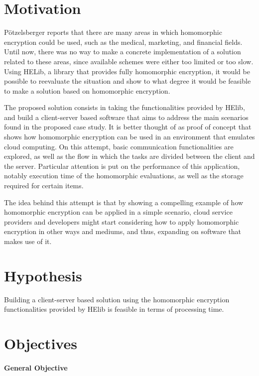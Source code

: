 \section{Motivation}

P{\"o}tzelsberger \cite{potzelsberger2013kv} reports that there are many areas in which homomorphic encryption could be used, such as the medical, marketing, and financial fields. Until now, there was no way to make a concrete implementation of a solution related to these areas, since available schemes were either too limited or too slow. Using HELib, a library that provides fully homomorphic encryption, it would be possible to reevaluate the situation and show to what degree it would be feasible to make a solution based on homomorphic encryption.

The proposed solution consists in taking the functionalities provided by HElib, and build a client-server based software that aims to address the main scenarios found in the proposed case study. It is better thought of as proof of concept that shows how homomorphic encryption can be used in an environment that emulates cloud computing. On this attempt, basic communication functionalities are explored, as well as the flow in which the tasks are divided between the client and the server. Particular attention is put on the performance of this application, notably execution time of the homomorphic evaluations, as well as the storage required for certain items.

The idea behind this attempt is that by showing a compelling example of how homomorphic encryption can be applied in a simple scenario, cloud service providers and developers might start considering how to apply homomorphic encryption in other ways and mediums, and thus, expanding on software that makes use of it.

\section{Hypothesis}

Building a client-server based solution using the homomorphic encryption functionalities provided by HElib is feasible in terms of processing time.

\section{Objectives}

\paragraph{General Objective}

